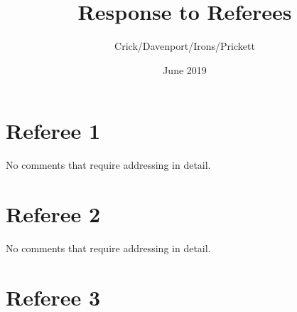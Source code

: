 \documentclass{article}
\begin{document}
\author{Crick/Davenport/Irons/Prickett}
\title{Response to Referees}
\date{June 2019}
\maketitle

\section{Referee 1}
No comments that require addressing in detail.
\section{Referee 2}
No comments that require addressing in detail.
\section{Referee 3}
\end{document}
